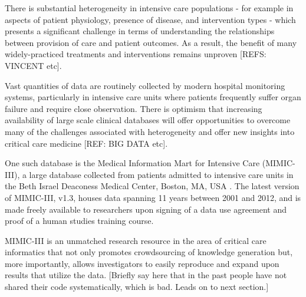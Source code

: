 \documentclass{bioinfo}
\begin{document}
There is substantial heterogeneity in intensive care populations - for example in aspects of patient physiology, presence of disease, and intervention types - which presents a significant challenge in terms of understanding the relationships between provision of care and patient outcomes. As a result, the benefit of many widely-practiced treatments and interventions remains unproven [REFS: VINCENT etc].

Vast quantities of data are routinely collected by modern hospital monitoring systems, particularly in intensive care units where patients frequently suffer organ failure and require close observation. There is optimism that increasing availability of large scale clinical databases will offer opportunities to overcome many of the challenges associated with heterogeneity and offer new insights into critical care medicine [REF: BIG DATA etc]. 

One such database is the Medical Information Mart for Intensive Care (MIMIC-III), a large database collected from patients admitted to intensive care units in the Beth Israel Deaconess Medical Center, Boston, MA, USA \cite{mimiciii}. The latest version of MIMIC-III, v1.3, houses data spanning 11 years between 2001 and 2012, and is made freely available to researchers upon signing of a data use agreement and proof of a human studies training course. 

MIMIC-III is an unmatched research resource in the area of critical care informatics that not only promotes crowdsourcing of knowledge generation but, more importantly, allows investigators to easily reproduce and expand upon results that utilize the data. [Briefly say here that in the past people have not shared their code systematically, which is bad. Leads on to next section.]



\end{document}
